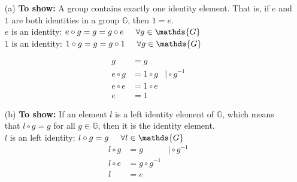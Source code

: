\begin{itemize}
	\item [(a)]
	\textbf{To show:} A group contains exactly one identity element. That is, if \(e\) and \(1\) are both identities
	in a group \(\mathds{G}\), then \(1 = e\).\\
	\(e\) is an identity: \(e \circ g = g = g \circ e \hspace{0.5cm} \forall g \in \mathds{G}\)\\
	\(1\) is an identity: \(1 \circ g = g = g \circ 1 \hspace{0.5cm} \forall g \in \mathds{G}\)
	
	\begin{equation*}
		\begin{array}{rll}
			g &=g &\\
			e \circ g &= 1 \circ g & \vert \circ g^{-1}\\
			e \circ e &= 1 \circ e & \\
			e &= 1 &			
		\end{array}
	\end{equation*}

	\item [(b)]
	\textbf{To show:} If an element \(l\) is a left identity element of \(\mathds{G}\), which means that \(l \circ g = g\) for all \(g \in \mathds{G}\), then it is the identity element.\\
	\(l\) is an left identity: \(l \circ g = g \hspace{0.5cm} \forall l \in \mathds{G}\)\\
	\begin{equation*}
		\begin{array}{rll}
			l \circ g &=g & \vert \circ g^{-1}\\
			l \circ e &= g \circ g^{-1} & \\
			l &= e &			
		\end{array}
	\end{equation*}


\end{itemize}
